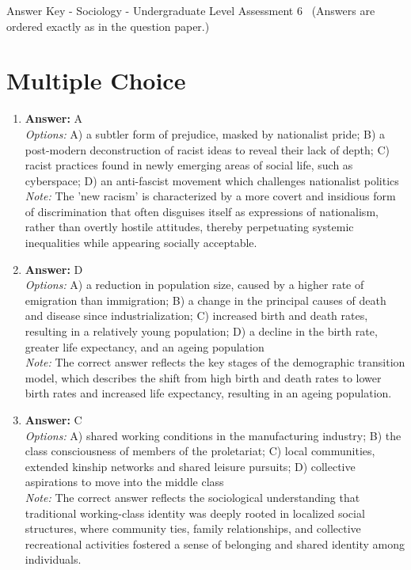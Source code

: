 \documentclass[12pt]{article}
\begin{document}
\begin{center}
Answer Key - Sociology - Undergraduate Level Assessment 6 \
\small (Answers are ordered exactly as in the question paper.)
\end{center}

\section*{Multiple Choice}
\begin{enumerate}[label=\arabic*.]
\item \textbf{Answer:} A
\\ \textit{Options:} A) a subtler form of prejudice, masked by nationalist pride; B) a post-modern deconstruction of racist ideas to reveal their lack of depth; C) racist practices found in newly emerging areas of social life, such as cyberspace; D) an anti-fascist movement which challenges nationalist politics
\\ \textit{Note:} The 'new racism' is characterized by a more covert and insidious form of discrimination that often disguises itself as expressions of nationalism, rather than overtly hostile attitudes, thereby perpetuating systemic inequalities while appearing socially acceptable.
\item \textbf{Answer:} D
\\ \textit{Options:} A) a reduction in population size, caused by a higher rate of emigration than immigration; B) a change in the principal causes of death and disease since industrialization; C) increased birth and death rates, resulting in a relatively young population; D) a decline in the birth rate, greater life expectancy, and an ageing population
\\ \textit{Note:} The correct answer reflects the key stages of the demographic transition model, which describes the shift from high birth and death rates to lower birth rates and increased life expectancy, resulting in an ageing population.
\item \textbf{Answer:} C
\\ \textit{Options:} A) shared working conditions in the manufacturing industry; B) the class consciousness of members of the proletariat; C) local communities, extended kinship networks and shared leisure pursuits; D) collective aspirations to move into the middle class
\\ \textit{Note:} The correct answer reflects the sociological understanding that traditional working-class identity was deeply rooted in localized social structures, where community ties, family relationships, and collective recreational activities fostered a sense of belonging and shared identity among individuals.

\end{enumerate}
\end{document}
